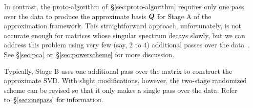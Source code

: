 \documentclass[final]{siamltex}
\newcounter{algorithm}[section]
\begin{document}
In contrast, the proto-algorithm of~\S\ref{sec:proto-algorithm}
requires only one pass over the data to produce the approximate basis
$\bm{Q}$ for Stage A of the approximation framework.
This straightforward approach, unfortunately, is not accurate enough for
matrices whose singular spectrum decays slowly, but we can address this
problem using very few (say, $2$ to $4$) additional passes over the
data~\cite{tygert_szlam}.
See \S\ref{sec:pca} or~\S\ref{sec:powerscheme} for more discussion.


Typically, Stage B uses one additional pass over the matrix to
construct the approximate SVD.
With slight modifications, however, the two-stage randomized scheme
can be revised so that it only makes a single pass over the
data.  Refer to~\S\ref{sec:onepass} for information.

\end{document}
